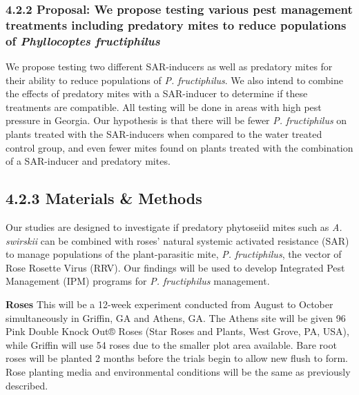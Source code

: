 \documentclass[12pt,final,CPage]{ufthesis}
\begin{document}
{  \hypertarget{proposal-we-propose-testing-various-pest-management-treatments-including-predatory-mites-to-reduce-populations-of-phyllocoptes-fructiphilus}{%
  \subsubsection{\texorpdfstring{4.2.2 Proposal: We propose testing various pest management treatments including predatory mites to reduce populations of \emph{Phyllocoptes fructiphilus}}{4.2.2 Proposal: We propose testing various pest management treatments including predatory mites to reduce populations of Phyllocoptes fructiphilus}}\label{proposal-we-propose-testing-various-pest-management-treatments-including-predatory-mites-to-reduce-populations-of-phyllocoptes-fructiphilus}}

  We propose testing two different SAR-inducers as well as predatory mites for their ability to reduce populations of \emph{P. fructiphilus}. We also intend to combine the effects of predatory mites with a SAR-inducer to determine if these treatments are compatible. All testing will be done in areas with high pest pressure in Georgia. Our hypothesis is that there will be fewer \emph{P. fructiphilus} on plants treated with the SAR-inducers when compared to the water treated control group, and even fewer mites found on plants treated with the combination of a SAR-inducer and predatory mites.

  \hypertarget{materials-methods}{%
  \subsection{4.2.3 Materials \& Methods}\label{materials-methods}}

  Our studies are designed to investigate if predatory phytoseiid mites such as \emph{A. swirskii} can be combined with roses' natural systemic activated resistance (SAR) to manage populations of the plant-parasitic mite, \emph{P. fructiphilus}, the vector of Rose Rosette Virus (RRV). Our findings will be used to develop Integrated Pest Management (IPM) programs for \emph{P. fructiphilus} management.

  \textbf{Roses}
  This will be a 12-week experiment conducted from August to October simultaneously in Griffin, GA and Athens, GA.
  The Athens site will be given 96 Pink Double Knock Out® Roses (Star Roses and Plants, West Grove, PA, USA), while Griffin will use 54 roses due to the smaller plot area available. Bare root roses will be planted 2 months before the trials begin to allow new flush to form. Rose planting media and environmental conditions will be the same as previously described.

}
\end{document}

